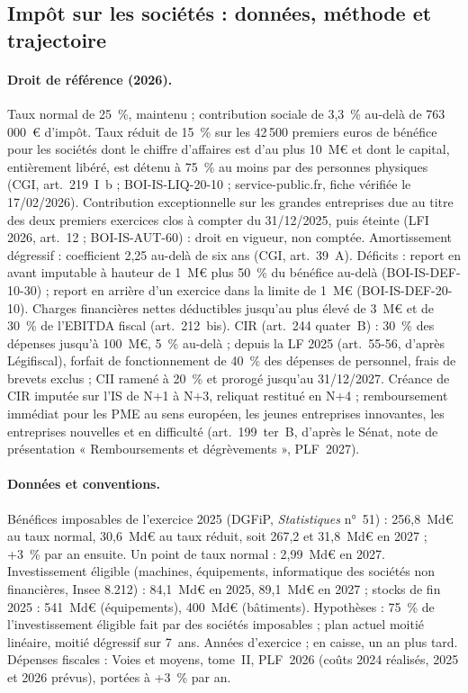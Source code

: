 \subsection{Impôt sur les sociétés : données, méthode et trajectoire}\label{ann:is}

\paragraph{Droit de référence (2026).} Taux normal de 25~\%, maintenu ; contribution sociale de 3,3~\% au-delà de
763\,000~€ d'impôt. Taux réduit de 15~\% sur les 42\,500 premiers euros de bénéfice pour les sociétés dont le chiffre
d'affaires est d'au plus 10~M€ et dont le capital, entièrement libéré, est détenu à 75~\% au moins par des personnes
physiques (CGI, art.~219~I~b ; BOI-IS-LIQ-20-10 ; service-public.fr, fiche vérifiée le 17/02/2026). Contribution
exceptionnelle sur les grandes entreprises due au titre des deux premiers exercices clos à compter du 31/12/2025, puis
éteinte (LFI 2026, art.~12 ; BOI-IS-AUT-60) : droit en vigueur, non comptée. Amortissement dégressif : coefficient 2,25
au-delà de six ans (CGI, art.~39~A). Déficits : report en avant imputable à hauteur de 1~M€ plus 50~\% du bénéfice
au-delà (BOI-IS-DEF-10-30) ; report en arrière d'un exercice dans la limite de 1~M€ (BOI-IS-DEF-20-10). Charges
financières nettes déductibles jusqu'au plus élevé de 3~M€ et de 30~\% de l'EBITDA fiscal (art.~212~bis). CIR (art.~244
quater~B) : 30~\% des dépenses jusqu'à 100~M€, 5~\% au-delà ; depuis la LF 2025 (art.~55-56, d'après Légifiscal), forfait
de fonctionnement de 40~\% des dépenses de personnel, frais de brevets exclus ; CII ramené à 20~\% et prorogé jusqu'au
31/12/2027. Créance de CIR imputée sur l'IS de N+1 à N+3, reliquat restitué en N+4 ; remboursement immédiat pour les PME
au sens européen, les jeunes entreprises innovantes, les entreprises nouvelles et en difficulté (art.~199~ter~B, d'après
le Sénat, note de présentation « Remboursements et dégrèvements », PLF~2027).

\paragraph{Données et conventions.} Bénéfices imposables de l'exercice 2025 (DGFiP, \emph{Statistiques} n°~51) : 256,8~Md€
au taux normal, 30,6~Md€ au taux réduit, soit 267,2 et 31,8~Md€ en 2027 ; +3~\% par an ensuite. Un point de taux normal :
2,99~Md€ en 2027. Investissement éligible (machines, équipements, informatique des sociétés non financières, Insee
8.212) : 84,1~Md€ en 2025, 89,1~Md€ en 2027 ; stocks de fin 2025 : 541~Md€ (équipements), 400~Md€ (bâtiments).
Hypothèses : 75~\% de l'investissement éligible fait par des sociétés imposables ; plan actuel moitié linéaire, moitié
dégressif sur 7~ans. Années d'exercice ; en caisse, un an plus tard. Dépenses fiscales : Voies et moyens, tome~II,
PLF~2026 (coûts 2024 réalisés, 2025 et 2026 prévus), portées à +3~\% par an.

